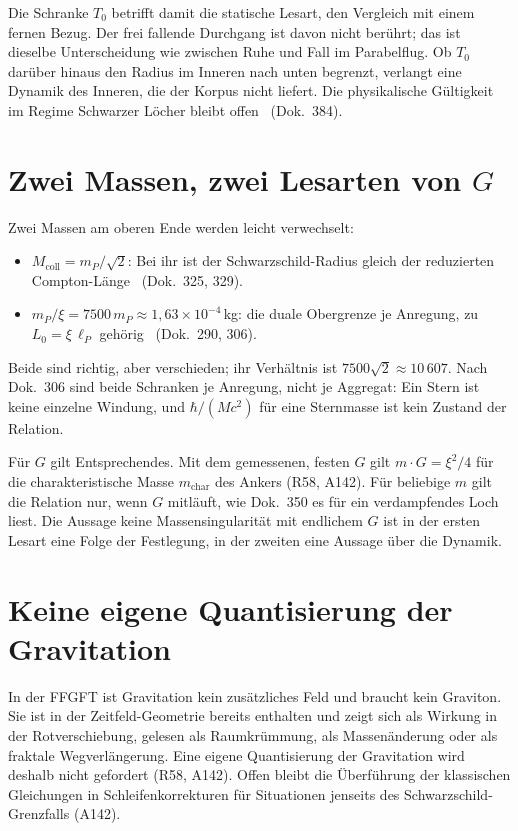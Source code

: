 Die Schranke $T_0$ betrifft damit die statische Lesart, den Vergleich mit einem fernen Bezug.
Der frei fallende Durchgang ist davon nicht berührt; das ist dieselbe Unterscheidung wie zwischen
Ruhe und Fall im Parabelflug. Ob $T_0$ darüber hinaus den Radius im Inneren nach unten begrenzt,
verlangt eine Dynamik des Inneren, die der Korpus nicht liefert. Die physikalische Gültigkeit im
Regime Schwarzer Löcher bleibt offen \SM\ (Dok.~384).

\section{Zwei Massen, zwei Lesarten von \texorpdfstring{$G$}{G}}

Zwei Massen am oberen Ende werden leicht verwechselt:
\begin{itemize}[leftmargin=*,itemsep=1pt]
\item $M_{\text{coll}}=m_P/\sqrt2$: Bei ihr ist der Schwarzschild-Radius gleich der reduzierten
Compton-Länge \BM\ (Dok.~325, 329).
\item $m_P/\xi=7500\,m_P\approx1{,}63\times10^{-4}$\,kg: die duale Obergrenze je Anregung,
zu $L_0=\xi\,\ell_P$ gehörig \KM\ (Dok.~290, 306).
\end{itemize}
Beide sind richtig, aber verschieden; ihr Verhältnis ist $7500\sqrt2\approx10\,607$. Nach
Dok.~306 sind beide Schranken je Anregung, nicht je Aggregat: Ein Stern ist keine einzelne
Windung, und $\hbar/(Mc^2)$ für eine Sternmasse ist kein Zustand der Relation.

Für $G$ gilt Entsprechendes. Mit dem gemessenen, festen $G$ gilt $m\cdot G=\xi^2/4$ für die
charakteristische Masse $m_{\text{char}}$ des Ankers (R58, A142). Für beliebige $m$ gilt die
Relation nur, wenn $G$ mitläuft, wie Dok.~350 es für ein verdampfendes Loch liest. Die Aussage
\glqq keine Massensingularität mit endlichem $G$\grqq{} ist in der ersten Lesart eine Folge der
Festlegung, in der zweiten eine Aussage über die Dynamik.

\section{Keine eigene Quantisierung der Gravitation}

In der FFGFT ist Gravitation kein zusätzliches Feld und braucht kein Graviton. Sie ist in der
Zeitfeld-Geometrie bereits enthalten und zeigt sich als Wirkung in der Rotverschiebung, gelesen
als Raumkrümmung, als Massenänderung oder als fraktale Wegverlängerung. Eine eigene Quantisierung
der Gravitation wird deshalb nicht gefordert (R58, A142). Offen bleibt die Überführung der
klassischen Gleichungen in Schleifenkorrekturen für Situationen jenseits des
Schwarzschild-Grenzfalls (A142).

